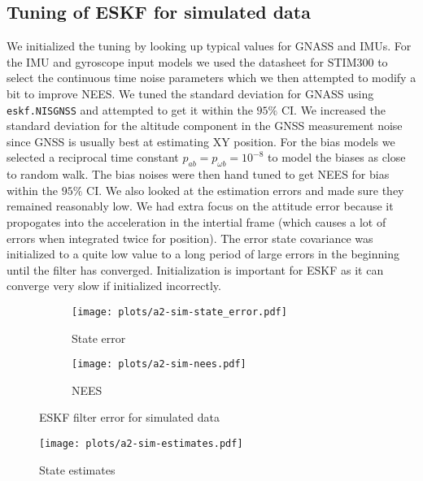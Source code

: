 \subsection{Tuning of ESKF for simulated data}

We initialized the tuning by looking up typical values for GNASS and IMUs. For the IMU and gyroscope input models we used the datasheet for STIM300 to select the continuous time noise parameters which we then attempted to modify a bit to improve NEES. We tuned the standard deviation for GNASS using \texttt{eskf.NISGNSS} and attempted to get it within the $95\%$ CI. We increased the standard deviation for the altitude component in the GNSS measurement noise since GNSS is usually best at estimating XY position. For the bias models we selected a reciprocal time constant $p_{ab} = p_{\omega b} = 10^{-8}$ to model the biases as close to random walk. The bias noises were then hand tuned to get NEES for bias within the $95\%$ CI. We also looked at the estimation errors and made sure they remained reasonably low. We had extra focus on the attitude error because it propogates into the acceleration in the intertial frame (which causes a lot of errors when integrated twice for position). The error state covariance was initialized to a quite low value to a long period of large errors in the beginning until the filter has converged. Initialization is important for ESKF as it can  converge very slow if initialized incorrectly. 

\begin{figure}
    \centering
    \hspace*{-2cm}\begin{adjustbox}{minipage=\linewidth, scale=1}
        \begin{subfigure}{.5\textwidth}
            \texttt{[image: plots/a2-sim-state\_error.pdf]} 
            \caption{State error}
            \label{fig:a2-sim-state_error}
        \end{subfigure}
        \begin{subfigure}{.5\textwidth}
            \texttt{[image: plots/a2-sim-nees.pdf]} 
            \caption{NEES}
            \label{fig:a2-sim-nees}
        \end{subfigure}
    \end{adjustbox}
        \caption{ESKF filter error for simulated data}
        \label{fig:a2-sim-error_NEES}
\end{figure}
\begin{figure}
    \centering
    \texttt{[image: plots/a2-sim-estimates.pdf]} 
    \caption{State estimates}
    \label{fig:a2-sim-estimates}
\end{figure}

 
